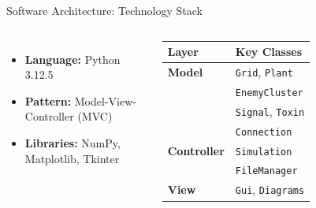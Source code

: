 \documentclass[aspectratio=169]{beamer}
\begin{document}
\begin{frame}{Software Architecture: Technology Stack}
    \begin{columns}[T, onlytextwidth]
        \vspace{0.2cm}
        \begin{itemize}
            \item \textbf{Language:} Python 3.12.5
            \item \textbf{Pattern:} Model-View-Controller (MVC)
            \item \textbf{Libraries:} NumPy, Matplotlib, Tkinter
        \end{itemize}
        \vspace{0.2cm}
        \centering
        {\small
        \begin{tabular}{@{}ll@{}}
            \toprule
            Layer & Key Classes \\
            \midrule
            \textbf{Model} & \texttt{Grid}, \texttt{Plant} \\
                           & \texttt{EnemyCluster} \\
                           & \texttt{Signal}, \texttt{Toxin} \\
                           & \texttt{Connection} \\
            \textbf{Controller} & \texttt{Simulation} \\
                                & \texttt{FileManager} \\
            \textbf{View} & \texttt{Gui}, \texttt{Diagrams} \\
            \bottomrule
        \end{tabular}
        }


\end{columns}
\end{frame}
\end{document}
